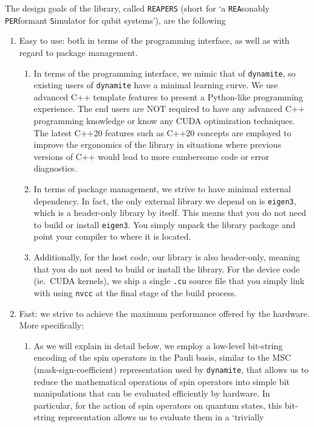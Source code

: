 \documentclass[preprint,12pt]{elsarticle}
\begin{document}
The design goals of the library, called {\tt REAPERS} (short for `a {\tt REA}sonably
{\tt PER}formant {\tt S}imulator for qubit systems'), are the following
\begin{enumerate}
\item Easy to use: both in terms of the programming interface, as well as with regard
  to package management.
  \begin{enumerate}
  \item In terms of the programming interface, we mimic that of {\tt dynamite}, so existing
    users of {\tt dynamite} have a minimal learning curve. We use advanced C++ template
    features to present a Python-like programming experience. The end users are NOT
    required to have any advanced C++ programming knowledge or know any CUDA optimization
    techniques. The latest C++20 features such as C++20 concepts are employed to improve
    the ergonomics of the library in situations where previous versions of C++ would lead to
    more cumbersome code or error diagnostics.
  \item In terms of package management, we strive to have minimal external dependency. In
    fact, the only external library we depend on is {\tt eigen3}, which is a header-only
    library by itself. This means that you do not need to build or install {\tt eigen3}.
    You simply unpack the library package and point your compiler to where it is located.
  \item Additionally, for the host code, our library is also header-only, meaning that you
    do not need to build or install the library. For the device code (ie.~CUDA kernels),
    we ship a single {\tt .cu} source file that you simply link with using {\tt nvcc} at
    the final stage of the build process.
  \end{enumerate}
\item Fast: we strive to achieve the maximum performance offered by the hardware. More
  specifically:
  \begin{enumerate}
  \item As we will explain in detail below, we employ a low-level bit-string encoding of
    the spin operators in the Pauli basis, similar to the MSC (mask-sign-coefficient)
    representation used by {\tt dynamite}, that allows us to reduce the mathematical
    operations of spin operators into simple bit manipulations that can be evaluated
    efficiently by hardware. In particular, for the action of spin operators on quantum
    states, this bit-string representation allows us to evaluate them in a `trivially

\end{enumerate}
\end{enumerate}
\end{document}
